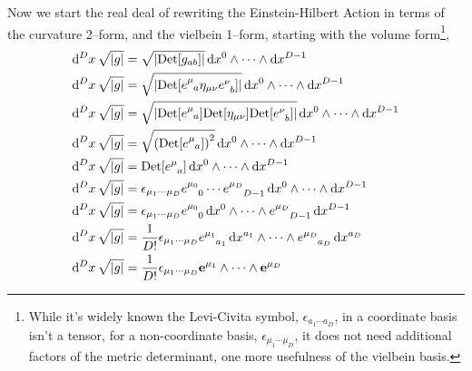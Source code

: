 Now we start the real deal of rewriting the 
Einstein-Hilbert Action in terms of the curvature 2--form, and the vielbein 1--form, starting with the volume form\footnote{While it's widely known the Levi-Civita symbol, $\epsilon_{a_1\cdots a_D}$, in a coordinate basis isn't a tensor, 
for a non-coordinate basis, $\epsilon_{\mu_1\cdots\mu_D}$, it does not need additional factors of the metric determinant, one more usefulness of the vielbein basis.},
\begin{align*}
    \dd[D]{x}\sqrt{\abs{g}}&=\sqrt{\abs{\Det\qty[g_{ab}]}}\dd{x^0}\wedge\cdots\wedge\dd{x^{D-1}}\\
    \dd[D]{x}\sqrt{\abs{g}}&=\sqrt{\abs{\Det\qty[\tensor{e}{^\mu_a}\eta_{\mu\nu}\tensor{e}{^\nu_b}]}}\dd{x^0}\wedge\cdots\wedge\dd{x^{D-1}}\\
    \dd[D]{x}\sqrt{\abs{g}}&=\sqrt{\abs{\Det\qty[\tensor{e}{^\mu_a}]\Det\qty[\eta_{\mu\nu}]\Det\qty[\tensor{e}{^\nu_b}]}}\dd{x^0}\wedge\cdots\wedge\dd{x^{D-1}}\\
    \dd[D]{x}\sqrt{\abs{g}}&=\sqrt{\qty(\Det\qty[\tensor{e}{^\mu_a}])^2}\dd{x^0}\wedge\cdots\wedge\dd{x^{D-1}}\\
    \dd[D]{x}\sqrt{\abs{g}}&=\Det\qty[\tensor{e}{^\mu_a}]\dd{x^0}\wedge\cdots\wedge\dd{x^{D-1}}\\
    \dd[D]{x}\sqrt{\abs{g}}&=\epsilon_{\mu_1\cdots\mu_{D}}\tensor{e}{^{\mu_0}_0}\cdots\tensor{e}{^{\mu_{D}}_{D-1}}\dd{x^0}\wedge\cdots\wedge\dd{x^{D-1}}\\
    \dd[D]{x}\sqrt{\abs{g}}&=\epsilon_{\mu_1\cdots\mu_{D}}\tensor{e}{^{\mu_0}_0}\dd{x^0}\wedge\cdots\wedge\tensor{e}{^{\mu_{D}}_{D-1}}\dd{x^{D-1}}\\
    \dd[D]{x}\sqrt{\abs{g}}&=\frac{1}{D!}\epsilon_{\mu_1\cdots\mu_{D}}\tensor{e}{^{\mu_1}_{a_1}}\dd{x^{a_1}}\wedge\cdots\wedge\tensor{e}{^{\mu_{D}}_{a_{D}}}\dd{x^{a_{D}}}\\
    \dd[D]{x}\sqrt{\abs{g}}&=\frac{1}{D!}\epsilon_{\mu_1\cdots\mu_{D}}\vb e^{\mu_1}\wedge\cdots\wedge\vb e^{\mu_{D}}
\end{align*}

